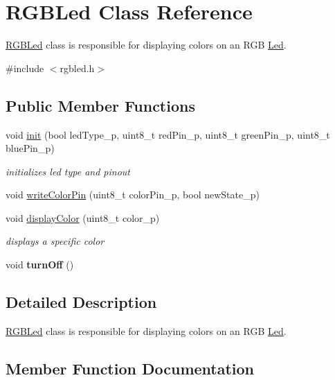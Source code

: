 \hypertarget{class_r_g_b_led}{}\section{R\+G\+B\+Led Class Reference}
\label{class_r_g_b_led}


\hyperlink{class_r_g_b_led}{R\+G\+B\+Led} class is responsible for displaying colors on an R\+GB \hyperlink{class_led}{Led}.  




{\ttfamily \#include $<$rgbled.\+h$>$}

\subsection*{Public Member Functions}
\begin{DoxyCompactItemize}
\item 
void \hyperlink{class_r_g_b_led_aa12ca52b63da78e35b6bbec3624df991}{init} (bool led\+Type\+\_\+p, uint8\+\_\+t red\+Pin\+\_\+p, uint8\+\_\+t green\+Pin\+\_\+p, uint8\+\_\+t blue\+Pin\+\_\+p)
\begin{DoxyCompactList}\small\item\em initializes led type and pinout \end{DoxyCompactList}\item 
void \hyperlink{class_r_g_b_led_a9ab9701eb0f4d945fd9ca6e2235d7ee9}{write\+Color\+Pin} (uint8\+\_\+t color\+Pin\+\_\+p, bool new\+State\+\_\+p)
\item 
void \hyperlink{class_r_g_b_led_a6a1e12a1f48fc29acd30aa88a1cfd1b1}{display\+Color} (uint8\+\_\+t color\+\_\+p)
\begin{DoxyCompactList}\small\item\em displays a specific color \end{DoxyCompactList}\item 
\mbox{\label{class_r_g_b_led_af00b4e0ef8ec0aea4452fc2133b03453}} 
void {\bfseries turn\+Off} ()
\end{DoxyCompactItemize}


\subsection{Detailed Description}
\hyperlink{class_r_g_b_led}{R\+G\+B\+Led} class is responsible for displaying colors on an R\+GB \hyperlink{class_led}{Led}. 

\subsection{Member Function Documentation}
\mbox{\label{class_r_g_b_led_a6a1e12a1f48fc29acd30aa88a1cfd1b1}} 
